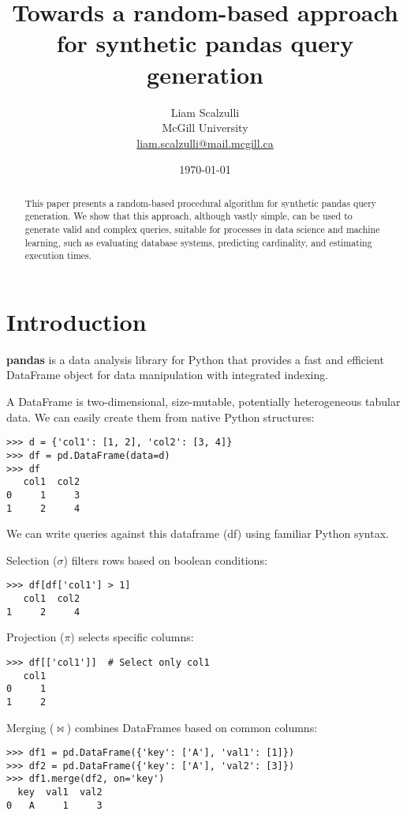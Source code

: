 \documentclass[10pt, twocolumn]{article}
\title{Towards a random-based approach for synthetic pandas query generation}
\author{
  Liam Scalzulli \\
  McGill University \\
  \href{mailto:liam.scalzulli@mail.mcgill.ca}{liam.scalzulli@mail.mcgill.ca}
}
\date{\today}
\begin{document}
\maketitle

\begin{abstract}
  This paper presents a random-based procedural algorithm for synthetic pandas query generation. We show that this approach, although vastly simple, can be used to generate valid and complex queries, suitable for processes in data science
  and machine learning, such as evaluating database systems,
  predicting cardinality, and estimating execution times.
\end{abstract}

\section{Introduction}

\textbf{pandas} is a data analysis library for Python that provides a fast and efficient DataFrame object for data manipulation with integrated indexing.

\spacing
\noindent
A DataFrame is two-dimensional, size-mutable, potentially heterogeneous tabular data. We can easily create them from native Python structures:

\begin{verbatim}
>>> d = {'col1': [1, 2], 'col2': [3, 4]}
>>> df = pd.DataFrame(data=d)
>>> df
   col1  col2
0     1     3
1     2     4
\end{verbatim}

\noindent
We can write queries against this dataframe (df) using familiar Python syntax.

\spacing
\noindent
Selection ($\sigma$) filters rows based on boolean conditions:

\begin{verbatim}
>>> df[df['col1'] > 1]
   col1  col2
1     2     4
\end{verbatim}

\noindent
Projection ($\pi$) selects specific columns:

\begin{verbatim}
>>> df[['col1']]  # Select only col1
   col1
0     1
1     2
\end{verbatim}

\noindent
Merging ($\bowtie$) combines DataFrames based on common columns:

\begin{verbatim}
>>> df1 = pd.DataFrame({'key': ['A'], 'val1': [1]})
>>> df2 = pd.DataFrame({'key': ['A'], 'val2': [3]})
>>> df1.merge(df2, on='key')
  key  val1  val2
0   A     1     3
\end{verbatim}
\end{document}
